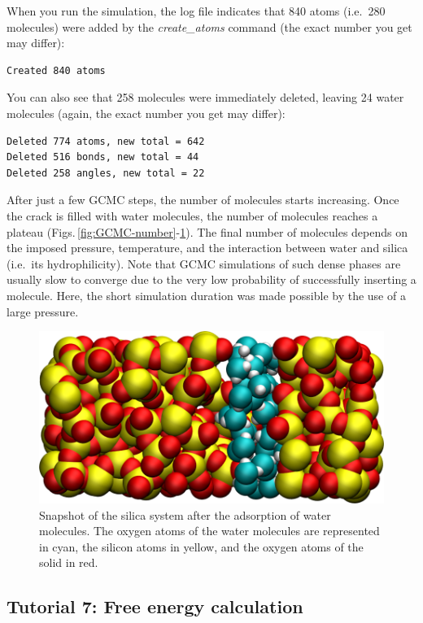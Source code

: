 \documentclass[9pt,tutorial]{livecoms}
\begin{document}
When you run the simulation, the log file indicates that 840 atoms (i.e.~280 molecules)
were added by the \textit{create\_atoms} command (the exact number you get may differ):
\begin{lstlisting}
Created 840 atoms
\end{lstlisting}
You can also see that 258 molecules were immediately deleted, leaving 24 water
molecules (again, the exact number you get may differ):
\begin{lstlisting}
Deleted 774 atoms, new total = 642
Deleted 516 bonds, new total = 44
Deleted 258 angles, new total = 22
\end{lstlisting}
After just a few GCMC steps, the number of molecules starts increasing. Once the
crack is filled with water molecules, the number of molecules reaches a plateau
(Figs.\,\ref{fig:GCMC-number}-\ref{fig:GCMC-solvated}). The final number of
molecules depends on the imposed pressure, temperature, and the interaction
between water and silica (i.e.~its hydrophilicity). Note that GCMC simulations
of such dense phases are usually slow to converge due to the very low probability
of successfully inserting a molecule. Here, the short simulation duration was
made possible by the use of a large pressure.

\begin{figure}
\centering
\includegraphics[width=\linewidth]{GCMC-solvated}
\caption{Snapshot of the silica system after the adsorption of water molecules.
The oxygen atoms of the water molecules are represented in cyan, the silicon
atoms in yellow, and the oxygen atoms of the solid in red.}
\label{fig:GCMC-solvated}
\end{figure}

\subsection{Tutorial 7: Free energy calculation}
\label{umbrella-sampling-label}
\end{document}

